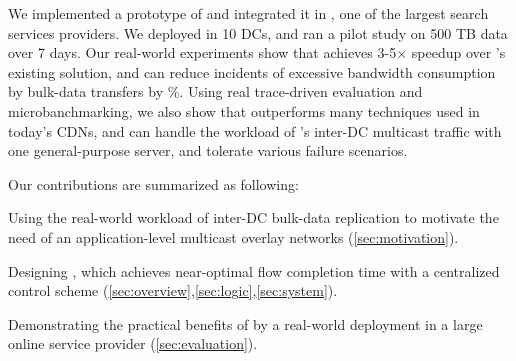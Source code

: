 We implemented a prototype of \name and integrated it in
\company, one of the largest search services providers. 
We deployed \name in 10 DCs, and ran a pilot study on 500 TB 
data over 7 days. 
Our real-world experiments show that \name achieves 3-5$\times$
speedup over \company's existing solution, and can reduce 
incidents of excessive bandwidth consumption by bulk-data
transfers by \fillme\%.
Using real trace-driven evaluation and microbanchmarking,
we also show that \name outperforms many techniques used in
today's CDNs, and \name can handle the workload of \company's 
inter-DC multicast traffic with one general-purpose server, 
and tolerate various failure scenarios.


Our contributions are summarized as following:
\begin{packeditemize}
\item Using the real-world workload of inter-DC bulk-data 
replication to motivate the need of an application-level 
multicast overlay networks (\Section\ref{sec:motivation}).
\item Designing \name, which achieves near-optimal flow completion
time with a centralized control scheme (\Section\ref{sec:overview},\ref{sec:logic},\ref{sec:system}).
\item Demonstrating the practical benefits of \name by a real-world
 deployment in a large online service provider (\Section\ref{sec:evaluation}).
\end{packeditemize}
